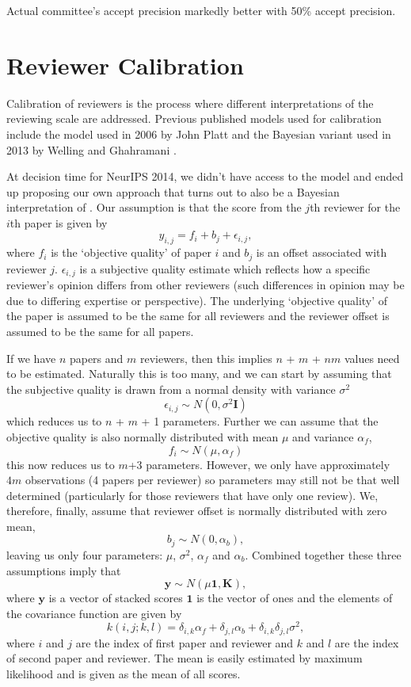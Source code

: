 Actual committee's accept precision markedly better with 50\% accept
precision.

\section{Reviewer Calibration}
\label{app:reviewer-calibration}

Calibration of reviewers is the process where different interpretations
of the reviewing scale are addressed. Previous published models used for calibration include the model used in 2006 by John Platt \citep{Platt-calibration12} and the Bayesian variant used in 2013 by Welling and Ghahramani \cite{Ge-bayesian15}.

At decision time for NeurIPS 2014, we didn't have access to the \cite{Ge-bayesian15} model and ended up proposing our own approach that turns out to also be a Bayesian interpretation of \cite{Platt-calibration12}. Our assumption is
that the score from the \(j\)th reviewer for the \(i\)th paper is given
by \[
y_{i,j} = f_i + b_j + \epsilon_{i, j},
\] 
where \(f_i\) is the `objective quality' of paper \(i\) and \(b_j\)
is an offset associated with reviewer \(j\). \(\epsilon_{i,j}\) is a
subjective quality estimate which reflects how a specific reviewer's
opinion differs from other reviewers (such differences in opinion may be
due to differing expertise or perspective). The underlying `objective
quality' of the paper is assumed to be the same for all reviewers and
the reviewer offset is assumed to be the same for all papers.

If we have \(n\) papers and \(m\) reviewers, then this implies \(n\) +
\(m\) + \(nm\) values need to be estimated. Naturally this is too many,
and we can start by assuming that the subjective quality is drawn from a
normal density with variance \(\sigma^2\) \[
\epsilon_{i, j} \sim N(0, \sigma^2 \mathbf{I})
\] which reduces us to \(n\) + \(m\) + 1 parameters. Further we can
assume that the objective quality is also normally distributed with mean
\(\mu\) and variance \(\alpha_f\), 
\[
f_i \sim N(\mu, \alpha_f)
\]
this now reduces us to \(m\)+3 parameters. However, we only have
approximately \(4m\) observations (4 papers per reviewer) so parameters
may still not be that well determined (particularly for those reviewers
that have only one review). We, therefore, finally, assume that reviewer
offset is normally distributed with zero mean, \[
b_j \sim N(0, \alpha_b),
\] leaving us only four parameters: \(\mu\), \(\sigma^2\), \(\alpha_f\)
and \(\alpha_b\). Combined together these three assumptions imply that
\[
\mathbf{y} \sim N(\mu \mathbf{1}, \mathbf{K}),
\]
where \(\mathbf{y}\) is a vector of stacked scores \(\mathbf{1}\) is
the vector of ones and the elements of the covariance function are given
by 
\[
k(i,j; k,l) = \delta_{i,k} \alpha_f + \delta_{j,l} \alpha_b + \delta_{i, k}\delta_{j,l} \sigma^2,
\] 
where \(i\) and \(j\) are the index of first paper and reviewer and
\(k\) and \(l\) are the index of second paper and reviewer. The mean is
easily estimated by maximum likelihood and is given as the mean of all
scores.


